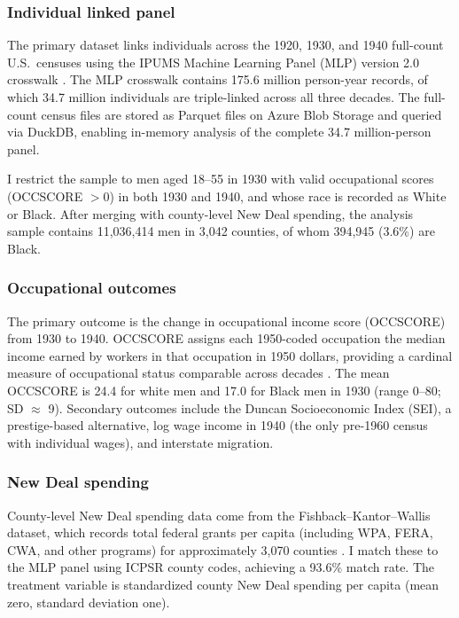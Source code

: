 \documentclass[12pt]{article}
\begin{document}
\subsubsection*{Individual linked panel} The primary dataset links individuals across the 1920, 1930, and 1940 full-count U.S.~censuses using the IPUMS Machine Learning Panel (MLP) version 2.0 crosswalk \citep{helgertz2024}. The MLP crosswalk contains 175.6 million person-year records, of which 34.7 million individuals are triple-linked across all three decades. The full-count census files are stored as Parquet files on Azure Blob Storage and queried via DuckDB, enabling in-memory analysis of the complete 34.7 million-person panel.

I restrict the sample to men aged 18--55 in 1930 with valid occupational scores (OCCSCORE $> 0$) in both 1930 and 1940, and whose race is recorded as White or Black. After merging with county-level New Deal spending, the analysis sample contains 11,036,414 men in 3,042 counties, of whom 394,945 (3.6\%) are Black.

\subsubsection*{Occupational outcomes} The primary outcome is the change in occupational income score (OCCSCORE) from 1930 to 1940. OCCSCORE assigns each 1950-coded occupation the median income earned by workers in that occupation in 1950 dollars, providing a cardinal measure of occupational status comparable across decades \citep{ipums2024}. The mean OCCSCORE is 24.4 for white men and 17.0 for Black men in 1930 (range 0--80; SD $\approx$ 9). Secondary outcomes include the Duncan Socioeconomic Index (SEI), a prestige-based alternative, log wage income in 1940 (the only pre-1960 census with individual wages), and interstate migration.

\subsubsection*{New Deal spending} County-level New Deal spending data come from the Fishback--Kantor--Wallis dataset, which records total federal grants per capita (including WPA, FERA, CWA, and other programs) for approximately 3,070 counties \citep{fishback2003}. I match these to the MLP panel using ICPSR county codes, achieving a 93.6\% match rate. The treatment variable is standardized county New Deal spending per capita (mean zero, standard deviation one).
\end{document}
